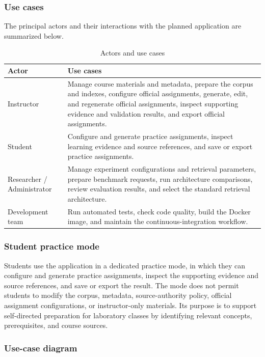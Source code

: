\documentclass[12pt,a4paper]{article}
\begin{document}
\subsubsection*{Use cases}

The principal actors and their interactions with the planned
application are summarized below.

\begin{table}[htbp]
\centering
\small
\renewcommand{\arraystretch}{1.3}
\begin{tabularx}{\textwidth}{|p{35mm}|X|}
\hline
\textbf{Actor} & \textbf{Use cases} \\
\hline
Instructor &
Manage course materials and metadata, prepare the corpus and
indexes, configure official assignments, generate, edit, and
regenerate official assignments, inspect supporting evidence
and validation results, and export official assignments. \\
\hline
Student &
Configure and generate practice assignments, inspect learning
evidence and source references, and save or export practice
assignments. \\
\hline
Researcher / Administrator &
Manage experiment configurations and retrieval parameters,
prepare benchmark requests, run architecture comparisons,
review evaluation results, and select the standard retrieval
architecture. \\
\hline
Development team &
Run automated tests, check code quality, build the Docker image,
and maintain the continuous-integration workflow. \\
\hline
\end{tabularx}
\caption{Actors and use cases}
\label{tab:use-cases}
\end{table}

\subsubsection*{Student practice mode}

Students use the application in a dedicated practice mode, in
which they can configure and generate practice assignments,
inspect the supporting evidence and source references, and save
or export the result. The mode does not permit students to
modify the corpus, metadata, source-authority policy, official
assignment configurations, or instructor-only materials. Its
purpose is to support self-directed preparation for laboratory
classes by identifying relevant concepts, prerequisites, and
course sources.

\subsubsection*{Use-case diagram}
\end{document}
